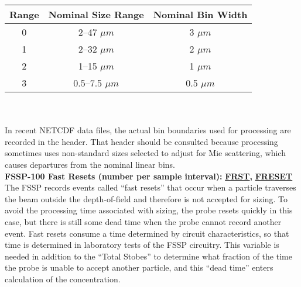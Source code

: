 \begin{hangparagraphs}
\noindent %
\begin{minipage}[t]{0.9\textwidth}%
\noindent \hspace*{0.7in}%
\begin{tabular}{|c|c|c|}
\hline 
Range & \textbf{Nominal Size Range} & \textbf{Nominal Bin Width}\tabularnewline
\hline 
\hline 
0 & 2--47 $\mu m$ & 3 $\mu m$\tabularnewline
\hline 
1 & 2--32 $\mu m$ & 2 $\mu m$\tabularnewline
\hline 
2 & 1--15 $\mu m$ & 1 $\mu m$\tabularnewline
\hline 
3 & 0.5--7.5 $\mu m$ & 0.5 $\mu m$\tabularnewline
\hline 
\end{tabular}%
\end{minipage}\\
\\
In recent NETCDF data files, the actual bin boundaries used for processing
are recorded in the header. That header should be consulted because
processing sometimes uses non-standard sizes selected to adjust for
Mie scattering, which causes departures from the nominal linear bins.
\\


\textbf{FSSP-100 Fast Resets (number per sample interval): }\textbf{\uline{FRST}}\textbf{,
}\textbf{\uline{FRESET}}\textbf{}\\
The FSSP records events called ``fast
resets'' that occur when a particle traverses the beam outside the
depth-of-field and therefore is not accepted for sizing. To avoid
the processing time associated with sizing, the probe resets quickly
in this case, but there is still some dead time
when the probe cannot record another event. Fast resets consume a
time determined by circuit characteristics, so that time is determined
in laboratory tests of the FSSP circuitry. This variable is needed
in addition to the ``Total Stobes'' to determine what fraction of
the time the probe is unable to accept another particle, and this
``dead time'' enters calculation of the concentration. \\



\end{hangparagraphs}
